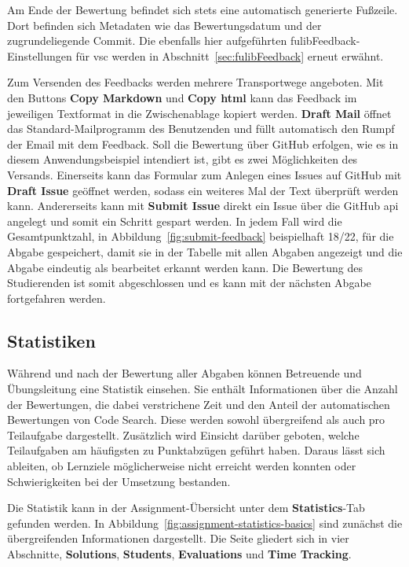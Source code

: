 Am Ende der Bewertung befindet sich stets eine automatisch generierte Fußzeile.
Dort befinden sich Metadaten wie das Bewertungsdatum und der zugrundeliegende Commit.
Die ebenfalls hier aufgeführten fulibFeedback-Einstellungen für \ac{vsc} werden in Abschnitt~\ref{sec:fulibFeedback} erneut erwähnt.

Zum Versenden des Feedbacks werden mehrere Transportwege angeboten.
Mit den Buttons \textbf{Copy Markdown} und \textbf{Copy \acs{html}} kann das Feedback im jeweiligen Textformat in die Zwischenablage kopiert werden.
\textbf{Draft Mail} öffnet das Standard-Mailprogramm des Benutzenden und füllt automatisch den Rumpf der Email mit dem Feedback.
Soll die Bewertung über GitHub erfolgen, wie es in diesem Anwendungsbeispiel intendiert ist, gibt es zwei Möglichkeiten des Versands.
Einerseits kann das Formular zum Anlegen eines Issues auf GitHub mit \textbf{Draft Issue} geöffnet werden, sodass ein weiteres Mal der Text überprüft werden kann.
Andererseits kann mit \textbf{Submit Issue} direkt ein Issue über die GitHub \ac{api} angelegt und somit ein Schritt gespart werden.
In jedem Fall wird die Gesamtpunktzahl, in Abbildung~\ref{fig:submit-feedback} beispielhaft 18/22, für die Abgabe gespeichert, damit sie in der Tabelle mit allen Abgaben angezeigt und die Abgabe eindeutig als bearbeitet erkannt werden kann.
Die Bewertung des Studierenden ist somit abgeschlossen und es kann mit der nächsten Abgabe fortgefahren werden.

\subsection{Statistiken}\label{subsec:statistics}

Während und nach der Bewertung aller Abgaben können Betreuende und Übungsleitung eine Statistik einsehen.
Sie enthält Informationen über die Anzahl der Bewertungen, die dabei verstrichene Zeit und den Anteil der automatischen Bewertungen von Code Search.
Diese werden sowohl übergreifend als auch pro Teilaufgabe dargestellt.
Zusätzlich wird Einsicht darüber geboten, welche Teilaufgaben am häufigsten zu Punktabzügen geführt haben.
Daraus lässt sich ableiten, ob Lernziele möglicherweise nicht erreicht werden konnten oder Schwierigkeiten bei der Umsetzung bestanden.

Die Statistik kann in der Assignment-Übersicht unter dem \textbf{Statistics}-Tab gefunden werden.
In Abbildung~\ref{fig:assignment-statistics-basics} sind zunächst die übergreifenden Informationen dargestellt.
Die Seite gliedert sich in vier Abschnitte, \textbf{Solutions}, \textbf{Students}, \textbf{Evaluations} und \textbf{Time Tracking}.

